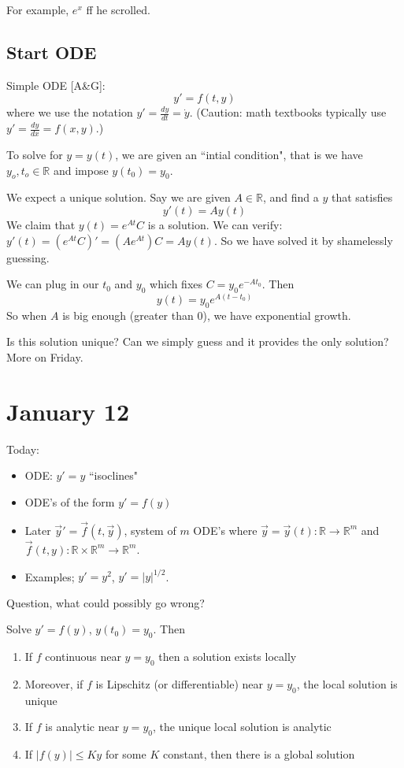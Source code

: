 \documentclass{article}
\theoremstyle{plain}
\theoremstyle{remark}
\newcommand{\R}{{\mathbb R}}
\begin{document}
For example, $e^x$ ff he scrolled.

\subsection{Start ODE}
Simple ODE [A\&G]:
\[
	y' = f(t,y)
\]
where we use the notation $y' = \frac{dy}{dt} = \dot{y}$.
(Caution: math textbooks typically use $y' = \frac{dy}{dx} = f(x,y)$.)

To solve for $y = y(t)$, we are given an ``intial condition",
that is we have $y_o,t_o \in \R$ and impose $y(t_0) = y_0$.

We expect a unique solution. Say we are given $A \in \R$, and find a $y$ that satisfies
\[
	y'(t) = Ay(t)
\]
We claim that $y(t) = e^{At}C$ is a solution.
We can verify: $y'(t) = (e^{At}C)' = (Ae^{At})C = Ay(t)$.
So we have solved it by shamelessly guessing.

We can plug in our $t_0$ and $y_0$ which fixes $C = y_0e^{-At_0}$.
Then
\[
	y(t) = y_0 e^{A(t-t_0)}
\]
So when $A$ is big enough (greater than $0$),
we have exponential growth.

Is this solution unique? Can we simply guess and it provides the only solution? More on Friday.

\section{January 12}
Today:
\begin{itemize}
	\item ODE: $y' = y$ ``isoclines"
	\item ODE's of the form $y' = f(y)$
	\item Later $\vec{y}' = \vec{f}(t,\vec{y})$, system of $m$ ODE's where
	$\vec{y} = \vec{y}(t) \colon \R \to \R^m$
	and $\vec{f}(t,y) \colon \R \times \R^m \to \R^m$.
	\item Examples; $y' = y^2$, $y' = |y|^{1/2}$.
\end{itemize}
Question, what could possibly go wrong?

Solve $y' = f(y)$, $y(t_0) = y_0$. Then
\begin{enumerate}
	\item If $f$ continuous near $y = y_0$ then a solution exists locally
	\item Moreover, if $f$ is Lipschitz (or differentiable) near $y = y_0$,
		the local solution is unique
	\item If $f$ is analytic near $y = y_0$, the unique local solution is analytic
	\item If $|f(y)| \leq Ky$ for some $K$ constant, then there is a global solution
\end{enumerate}
\end{document}

